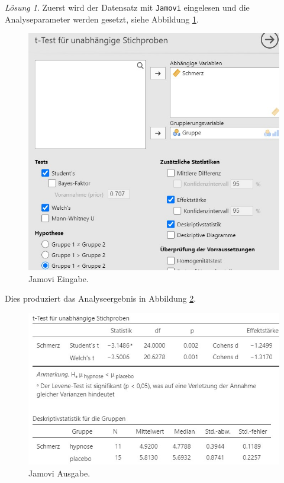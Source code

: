 \documentclass[
]{book}
\theoremstyle{definition}
\theoremstyle{definition}
\theoremstyle{definition}
\theoremstyle{definition}
\theoremstyle{remark}
\newtheorem*{solution}{Lösung}
\begin{document}
\begin{solution}

Zuerst wird der Datensatz mit \texttt{Jamovi} eingelesen und die Analyseparameter werden gesetzt, siehe Abbildung \ref{fig:sol-hypnose-input}.

\begin{figure}
\includegraphics[width=1\linewidth]{figures/06-exr-hypnose-jmv-input} \caption{Jamovi Eingabe.}\label{fig:sol-hypnose-input}
\end{figure}

Dies produziert das Analyseergebnis in Abbildung \ref{fig:sol-hypnose-output}.

\begin{figure}
\includegraphics[width=1\linewidth]{figures/06-exr-hypnose-jmv-output} \caption{Jamovi Ausgabe.}\label{fig:sol-hypnose-output}
\end{figure}


\end{solution}
\end{document}
